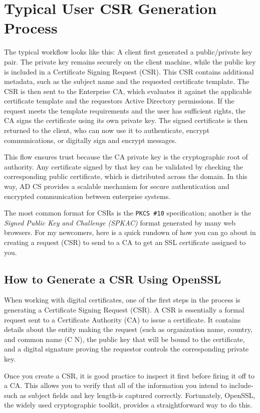 \section{Typical User CSR Generation Process}

The typical workflow looks like this: A client first generated a public/private key pair. The private key remains securely on the client machine, while the public key is included in a Certificate Signing Request (CSR). This CSR contains additional metadata, such as the subject name and the requested certificate template. The CSR is then sent to the Enterprise CA, which evaluates it against the applicable certificate template and the requestors Active Directory permissions. If the request meets the template requirements and the user has sufficient rights, the CA signs the certificate using its own private key. The signed certificate is then returned to the client, who can now use it to authenticate, encrypt communications, or digitally sign and encrypt messages.

This flow ensures trust because the CA private key is the cryptographic root of authority. Any certificate signed by that key can be validated by checking the corresponding public certificate, which is distributed across the domain. In this way, AD CS provides a scalable mechanism for secure authentication and encrypted communication between enterprise systems.

The most common format for CSRs is the \texttt{PKCS \#10} specification; another is the \textit{Signed Public Key and Challenge (SPKAC)} format generated by many web browsers. For my newcomers, here is a quick rundown of how you can go about in creating a request (CSR) to send to a CA to get an SSL certificate assigned to you.

\subsection{How to Generate a CSR Using OpenSSL}
When working with digital certificates, one of the first steps in the process is generating a Certificate Signing Request (CSR). A CSR is essentially a formal request sent to a Certificate Authority (CA) to issue a certificate. It contains details about the entity making the request (such as organization name, country, and common name (C N), the public key that will be bound to the certificate, and a digital signature proving the requestor controls the corresponding private key.

Once you create a CSR, it is good practice to inspect it first before firing it off to a CA. This allows you to verify that all of the information you intend to include-such as subject fields and key length-is captured correctly. Fortunately, OpenSSL, the widely used cryptographic toolkit, provides a straightforward way to do this.


